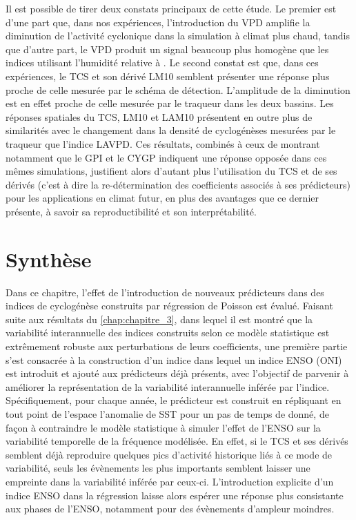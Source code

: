 \documentclass[../main.tex]{subfiles}
\begin{document}
Il est possible de tirer deux constats principaux de cette étude. Le premier est d'une part que, dans nos expériences, l'introduction du VPD amplifie la
diminution de l'activité cyclonique dans la simulation à climat plus chaud, tandis que d'autre part, le VPD produit un signal beaucoup plus homogène que les
indices utilisant l'humidité relative à . Le second constat est que, dans ces expériences, le TCS et son dérivé LM10 semblent présenter une réponse
plus proche de celle mesurée par le schéma de détection. L'amplitude de la diminution est en effet proche de celle mesurée par le traqueur dans les deux
bassins. Les réponses spatiales du TCS, LM10 et LAM10 présentent en outre plus de similarités avec le changement dans la densité de cyclogénèses mesurées par le
traqueur que l'indice LAVPD. Ces résultats, combinés à ceux de \textcite{cattiaux_projected_2020,chauvin_future_2020} montrant notamment que le GPI et le CYGP
indiquent une réponse opposée dans ces mêmes simulations, justifient alors d'autant plus l'utilisation du TCS et de ses dérivés (c'est à dire la re-détermination
des coefficients associés à ses prédicteurs) pour les applications en climat futur, en plus des avantages que ce dernier présente, à savoir sa reproductibilité
et son interprétabilité.

\section{Synthèse}

Dans ce chapitre, l'effet de l'introduction de nouveaux prédicteurs dans des indices de cyclogénèse construits par régression de Poisson est évalué. Faisant
suite aux résultats du \cref{chap:chapitre_3}, dans lequel il est montré que la variabilité interannuelle des indices construits selon ce modèle statistique est
extrêmement robuste aux perturbations de leurs coefficients, une première partie s'est consacrée à la construction d'un indice dans lequel un indice ENSO (ONI)
est introduit et ajouté aux prédicteurs déjà présents, avec l'objectif de parvenir à améliorer la représentation de la variabilité interannuelle inférée par
l'indice. Spécifiquement, pour chaque année, le prédicteur est construit en répliquant en tout point de l'espace l'anomalie de SST pour un pas de temps de donné, de façon à
contraindre le modèle statistique à simuler l'effet de l'ENSO sur la variabilité temporelle de la fréquence modélisée. En effet, si le TCS et ses dérivés
semblent déjà reproduire quelques pics d'activité historique liés à ce mode de variabilité, seuls les évènements les plus importants semblent laisser une
empreinte dans la variabilité inférée par ceux-ci. L'introduction explicite d'un indice ENSO dans la régression laisse alors espérer une réponse plus
consistante aux phases de l'ENSO, notamment pour des évènements d'ampleur moindres.
\end{document}
